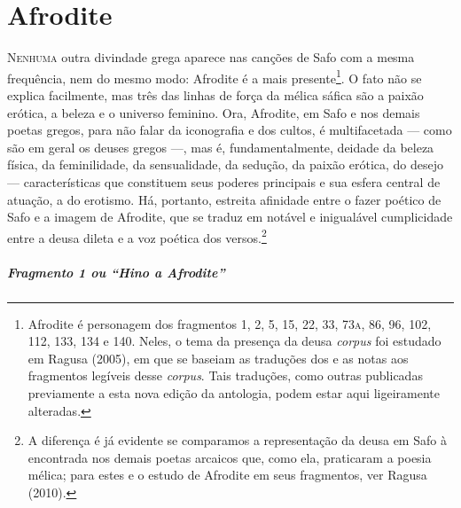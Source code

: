 


\chapter{Afrodite}

\textsc{Nenhuma} outra divindade grega aparece nas canções de Safo com a mesma
frequência, nem do mesmo modo: Afrodite é a mais presente\footnote{ Afrodite é
personagem dos fragmentos 1, 2, 5, 15, 22, 33, 73\textsc{a}, 86, 96, 102, 112, 133, 134
e 140. Neles, o tema da presença da deusa \textit{corpus} foi estudado em Ragusa (2005), em que se baseiam as traduções dos e as notas aos fragmentos legíveis desse \textit{corpus}. Tais traduções, como outras publicadas previamente a esta nova edição da antologia, podem estar aqui ligeiramente alteradas.}. O fato
não se explica facilmente, mas três das linhas de força da mélica sáfica são a
paixão erótica, a beleza e o universo feminino. Ora, Afrodite, em Safo e nos
demais poetas gregos, para não falar da iconografia e dos cultos, é
multifacetada --- como são em geral os deuses gregos ---, mas é, fundamentalmente,
deidade da beleza física, da feminilidade, da sensualidade, da sedução, da
paixão erótica, do desejo --- características que constituem seus poderes
principais e sua esfera central de atuação, a do erotismo. Há, portanto,
estreita afinidade entre o fazer poético de Safo e a imagem de Afrodite, que se
traduz em notável e inigualável cumplicidade entre a deusa dileta e a voz
poética dos versos.\footnote{ A diferença é já evidente se comparamos a
representação da deusa em Safo à encontrada nos demais poetas arcaicos que, como ela, praticaram a poesia mélica; para estes e o estudo de Afrodite em seus fragmentos, ver Ragusa (2010).}

\paragraph{Fragmento 1 ou “Hino a Afrodite”}

